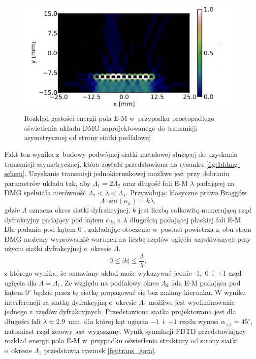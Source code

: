 \begin{figure}[tb]
	\includegraphics[width=\textwidth]{images/thz/opt_letters_dol.png}
	\caption{Rozkład gęstości energii pola E-M w~przypadku prostopadłego oświetlenia układu DMG zaprojektowanego do transmisji asymetrycznej od strony siatki podfalowej~\cite{Stolarek:13} }
	\label{fig:trans_dol}
\end{figure}

Fakt ten wynika z~budowy podwójnej siatki metalowej służącej do uzyskania transmisji asymetrycznej, która została przedstawiona na rysunku \ref{fig:1ddmg-schem}. Uzyskanie transmisji jednokierunkowej możliwe jest przy dobraniu parametrów układu tak, aby $\Lambda_1 = 2\Lambda_2$ oraz długość fali E-M $\lambda$ padającej na DMG  spełniała nierówność $\Lambda_2<\lambda<\Lambda_1$. Przywołując klasyczne prawo Braggów
\begin{equation}
	\Lambda \cdot \textrm{sin}(\alpha_k) = k \lambda,
\end{equation}
gdzie $\Lambda$ oznacza okres siatki dyfrakcyjnej, $k$ jest liczbą całkowitą numerującą rząd dyfrakcyjny padający pod kątem $\alpha_k$, a $\lambda$ długością padającej płaskiej fali E-M. Dla padania pod kątem $0^{\circ}$, zakładając otoczenie w~postaci powietrza z~obu stron DMG możemy wyprowadzić warunek na liczbę rzędów ugięcia uzyskiwanych przy użyciu siatki dyfrakcyjnej o~okresie $\Lambda$. 
\begin{equation}
	 0 \le |k| \le \frac { \Lambda }{\lambda},
\end{equation}
z którego wynika, że omawiany układ może wykazywać jednie -1,~0~i~+1 rząd ugięcia dla  $\Lambda=\Lambda_1$. Ze względu na podfalowy okres $\Lambda_2$ fala E-M padająca pod kątem $0^{\circ}$ będzie przez tę siatkę propagować się bez zmiany kierunku.  W wyniku interferencji za siatką dyfrakcyjną o~okresie $\Lambda_1$ możliwe jest wyeliminowanie jednego z~rzędów dyfrakcyjnych. Przedstawiona siatka projektowana jest dla długości fali $\lambda \approx 2.9$~mm, dla której kąt ugięcia $-1$~i~$+1$ rzędu wynosi $\alpha_{\pm 1} = 45^{\circ}$, natomiast rząd zerowy jest wygaszany. Wynik symulacji FDTD przedstawiający rozkład energii pola E-M w~przypadku oświetlenia struktury od strony siatki o~okresie $\Lambda_1$ przedstawia rysunek \ref{fig:trans_gora}.

